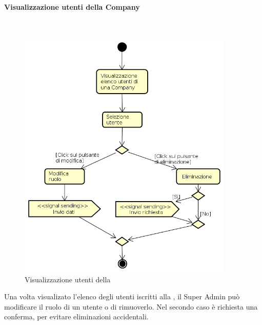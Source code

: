 \paragraph{Visualizzazione utenti della Company} \mbox{} \\
\begin{figure}[H]
\begin{center}
\includegraphics[height=12cm]{res/sections/backend/activities/operazioniUtentiSA.png}
\caption{Visualizzazione utenti della }
\end{center}
\end{figure}
Una volta visualizato l'elenco degli utenti iscritti alla , il Super Admin può modificare il ruolo di un utente o di rimuoverlo. Nel secondo caso è richiesta una conferma, per evitare eliminazioni accidentali.
